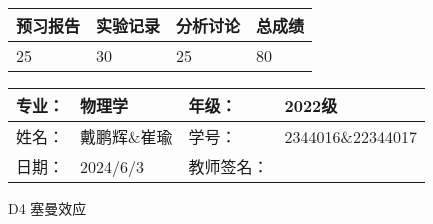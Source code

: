 \documentclass[dvipsnames, svgnames,a4paper,11pt]{article}
\begin{document}
\begin{table}
	\renewcommand\arraystretch{1.7}
	\begin{tabularx}{\textwidth}{
		|X|X|X|X
		|X|X|X|X|}
	\hline
	\multicolumn{2}{|c|}{预习报告}&\multicolumn{2}{|c|}{实验记录}&\multicolumn{2}{|c|}{分析讨论}&\multicolumn{2}{|c|}{总成绩}\\
	\hline
	\LARGE25 & & \LARGE30 & & \LARGE25 & & \LARGE80 & \\
	\hline
	\end{tabularx}
\end{table}


\begin{table}
	\renewcommand\arraystretch{1.7}
	\begin{tabularx}{\textwidth}{|X|X|X|X|}
	\hline
	专业：& 物理学 &年级：& 2022级\\
	\hline
	姓名：& 戴鹏辉\&崔瑜  & 学号： & 2344016\&22344017 \\
	\hline
	日期：& 2024/6/3 & 教师签名：& \\
	\hline
	\end{tabularx}
\end{table}

\begin{center}
	\LARGE D4  \quad 塞曼效应
\end{center}
\end{document}
